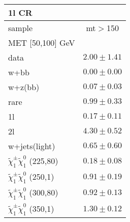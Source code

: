 \begin{table}
\begin{center}
\small
\begin{tabular}{lc}
\hline
1l CR & \\
\hline
sample&mt$>$150\\
\hline
MET [50,100] GeV &  \\
\hline
data&$2.00\pm1.41$\\
\hline
w+bb&$0.00\pm0.00$\\
w+z(bb)&$0.07\pm0.03$\\
rare&$0.99\pm0.33$\\
1l&$0.17\pm0.11$\\
2l&$4.30\pm0.52$\\
w+jets(light)&$0.65\pm0.60$\\
$\tilde{\chi}_{1}^{\pm}\tilde{\chi}_{1}^{0}$ (225,80)&$0.18\pm0.08$\\
$\tilde{\chi}_{1}^{\pm}\tilde{\chi}_{1}^{0}$ (250,1)&$0.91\pm0.19$\\
$\tilde{\chi}_{1}^{\pm}\tilde{\chi}_{1}^{0}$ (300,80)&$0.92\pm0.13$\\
$\tilde{\chi}_{1}^{\pm}\tilde{\chi}_{1}^{0}$ (350,1)&$1.30\pm0.12$\\
\hline
\hline\hline
\hline
\end{tabular}
\end{center}
\end{table}
